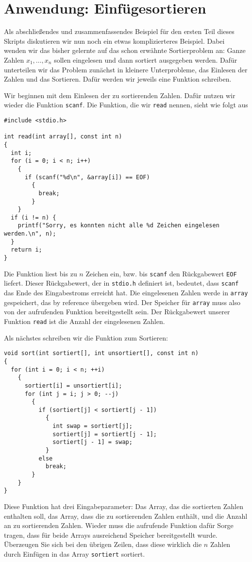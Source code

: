 \section{Anwendung: Einfügesortieren}

Als abschließendes und zusammenfassendes Beispiel für den ersten Teil dieses Skripts diskutieren wir nun noch ein etwas komplizierteres Beispiel.
Dabei wenden wir das bisher gelernte auf das schon erwähnte Sortierproblem an:
Ganze Zahlen $x_1, \ldots, x_n$ sollen eingelesen und dann sortiert ausgegeben werden.
Dafür unterteilen wir das Problem zunächst in kleinere Unterprobleme, das Einlesen der Zahlen und das Sortieren.
Dafür werden wir jeweils eine Funktion schreiben.

Wir beginnen mit dem Einlesen der zu sortierenden Zahlen.
Dafür nutzen wir wieder die Funktion \verb|scanf|.
Die Funktion, die wir \verb|read| nennen, sieht wie folgt aus
\begin{lstlisting}
#include <stdio.h>

int read(int array[], const int n)
{
  int i;
  for (i = 0; i < n; i++)
    {
      if (scanf("%d\n", &array[i]) == EOF)
        {
          break;
        }
    }
  if (i != n) {
    printf("Sorry, es konnten nicht alle %d Zeichen eingelesen werden.\n", n);
  }
  return i;
}
\end{lstlisting}
Die Funktion liest bis zu $n$ Zeichen ein, bzw. bis \verb|scanf| den Rückgabewert \verb|EOF| liefert.
Dieser Rückgabewert, der in \verb|stdio.h| definiert ist, bedeutet, dass \verb|scanf| das Ende des Eingabestroms erreicht hat.
Die eingelesenen Zahlen werde in \verb|array| gespeichert, das by reference übergeben wird.
Der Speicher für \verb|array| muss also von der aufrufenden Funktion bereitgestellt sein.
Der Rückgabewert unserer Funktion \verb|read| ist die Anzahl der eingelesenen Zahlen.

Als nächstes schreiben wir die Funktion zum Sortieren:
\begin{lstlisting}
void sort(int sortiert[], int unsortiert[], const int n)
{
  for (int i = 0; i < n; ++i)
    {
      sortiert[i] = unsortiert[i];
      for (int j = i; j > 0; --j)
        {
          if (sortiert[j] < sortiert[j - 1])
            {
              int swap = sortiert[j];
              sortiert[j] = sortiert[j - 1];
              sortiert[j - 1] = swap;
            }
          else
            break;
        }
    }
}
\end{lstlisting}
Diese Funktion hat drei Eingabeparameter: Das Array, das die sortierten Zahlen enthalten soll, das Array, dass die zu sortierenden Zahlen enthält, und die Anzahl an zu sortierenden Zahlen.
Wieder muss die aufrufende Funktion dafür Sorge tragen, dass für beide Arrays ausreichend Speicher bereitgestellt wurde.
Überzeugen Sie sich bei den übrigen Zeilen, dass diese wirklich die $n$ Zahlen durch Einfügen in das Array \verb|sortiert| sortiert.

